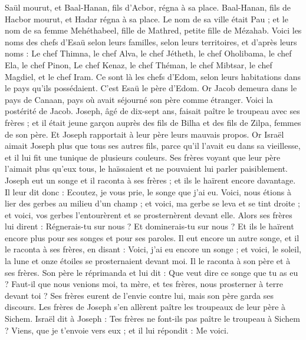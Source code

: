 \begin{multicols}{2}
Saül mourut, et Baal-Hanan, fils d’Acbor, régna à sa place.
Baal-Hanan, fils de Hacbor mourut, et Hadar régna à sa place. Le nom de sa ville était Pau ; et le nom de sa femme Mehéthabeel, fille de Mathred, petite fille de Mézahab.
Voici les noms des chefs d'Esaü selon leurs familles, selon leurs territoires, et d’après leurs noms : Le chef Thimna, le chef Alva, le chef Jétheth,
le chef Oholibama, le chef Ela, le chef Pinon,
Le chef Kenaz, le chef Théman, le chef Mibtsar,
le chef Magdiel, et le chef Iram. Ce sont là les chefs d'Edom, selon leurs habitations dans le pays qu’ils possédaient. C'est Esaü le père d'Edom.
\VerseOne{}Or Jacob demeura dans le pays de Canaan, pays où avait séjourné son père comme étranger.
Voici la postérité de Jacob. Joseph, âgé de dix-sept ans, faisait paître le troupeau avec ses frères ; et il était jeune garçon auprès des fils de Bilha et des fils de Zilpa, femmes de son père. Et Joseph rapportait à leur père leurs mauvais propos.
Or Israël aimait Joseph plus que tous ses autres fils, parce qu'il l'avait eu dans sa vieillesse, et il lui fit une tunique de plusieurs couleurs.
Ses frères voyant que leur père l'aimait plus qu'eux tous, le haïssaient et ne pouvaient lui parler paisiblement.
Joseph eut un songe et il raconta à ses frères ; et ils le haïrent encore davantage.
Il leur dit donc : Ecoutez, je vous prie, le songe que j'ai eu.
Voici, nous étions à lier des gerbes au milieu d'un champ ; et voici, ma gerbe se leva et se tint droite ; et voici, vos gerbes l’entourèrent et se prosternèrent devant elle.
Alors ses frères lui dirent : Régnerais-tu sur nous ? Et dominerais-tu sur nous ? Et ils le haïrent encore plus pour ses songes et pour ses paroles.
Il eut encore un autre songe, et il le raconta à ses frères, en disant : Voici, j'ai eu encore un songe ; et voici, le soleil, la lune et onze étoiles se prosternaient devant moi.
Il le raconta à son père et à ses frères. Son père le réprimanda et lui dit : Que veut dire ce songe que tu as eu ? Faut-il que nous venions moi, ta mère, et tes frères, nous prosterner à terre devant toi ?
Ses frères eurent de l'envie contre lui, mais son père garda ses discours.
Les frères de Joseph s'en allèrent paître les troupeaux de leur père à Sichem.
Israël dit à Joseph : Tes frères ne font-ils pas paître le troupeau à Sichem ? Viens, que je t'envoie vers eux ; et il lui répondit : Me voici.

\end{multicols}
